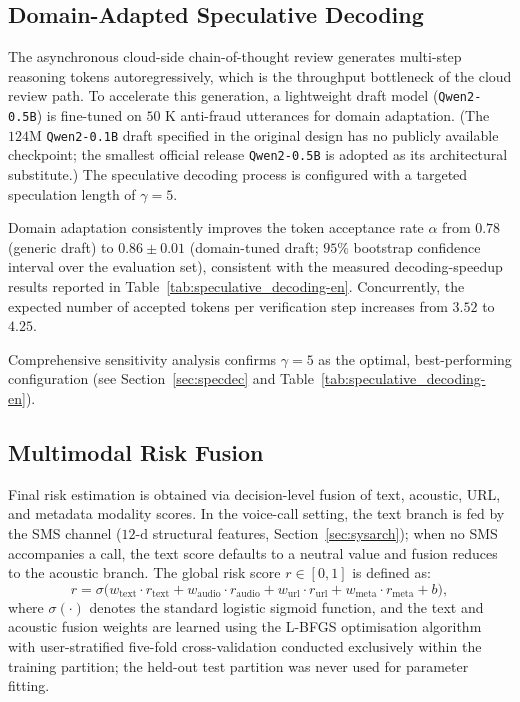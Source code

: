 \documentclass[a4paper,fleqn]{cas-sc}
\begin{document}
\subsection{Domain-Adapted Speculative Decoding}\label{sec:specdec-method}

The asynchronous cloud-side chain-of-thought review generates multi-step reasoning tokens autoregressively, which is the throughput bottleneck of the cloud review path. To accelerate this generation, a lightweight draft model (\texttt{Qwen2-0.5B}) is fine-tuned on $50\text{~K}$ anti-fraud utterances for domain adaptation. (The $124\text{M}$ \texttt{Qwen2-0.1B} draft specified in the original design has no publicly available checkpoint; the smallest official release \texttt{Qwen2-0.5B} is adopted as its architectural substitute.) The speculative decoding process is configured with a targeted speculation length of $\gamma = 5$.

Domain adaptation consistently improves the token acceptance rate $\alpha$ from $0.78$ (generic draft) to $0.86 \pm 0.01$ (domain-tuned draft; $95\%$ bootstrap confidence interval over the evaluation set), consistent with the measured decoding-speedup results reported in Table~\ref{tab:speculative_decoding-en}. Concurrently, the expected number of accepted tokens per verification step increases from $3.52$ to $4.25$.

Comprehensive sensitivity analysis confirms $\gamma = 5$ as the optimal, best-performing configuration (see Section~\ref{sec:specdec} and Table~\ref{tab:speculative_decoding-en}).

\subsection{Multimodal Risk Fusion}

Final risk estimation is obtained via decision-level fusion of text, acoustic, URL, and metadata modality scores. In the voice-call setting, the text branch is fed by the SMS channel ($12\text{-d}$ structural features, Section~\ref{sec:sysarch}); when no SMS accompanies a call, the text score defaults to a neutral value and fusion reduces to the acoustic branch. The global risk score $r \in [0, 1]$ is defined as:
\begin{equation}
\label{eq:fusion}
r = \sigma\bigl(w_{\mathrm{text}}\cdot r_{\mathrm{text}}
+ w_{\mathrm{audio}}\cdot r_{\mathrm{audio}}
+ w_{\mathrm{url}}\cdot r_{\mathrm{url}}
+ w_{\mathrm{meta}}\cdot r_{\mathrm{meta}} + b\bigr),
\end{equation}
where $\sigma(\cdot)$ denotes the standard logistic sigmoid function, and the text and acoustic fusion weights are learned using the L-BFGS optimisation algorithm with user-stratified five-fold cross-validation conducted exclusively within the training partition; the held-out test partition was never used for parameter fitting.
\end{document}
